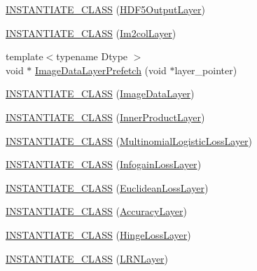 \begin{DoxyCompactItemize}
\item 
\hyperlink{namespacecaffe_a9c470a1804e112ffc6b67533c501a908}{I\+N\+S\+T\+A\+N\+T\+I\+A\+T\+E\+\_\+\+C\+L\+A\+S\+S} (\hyperlink{classcaffe_1_1_h_d_f5_output_layer}{H\+D\+F5\+Output\+Layer})
\item 
\hyperlink{namespacecaffe_a3333b145cd7e8fc3ea5bdc1dfce62ae9}{I\+N\+S\+T\+A\+N\+T\+I\+A\+T\+E\+\_\+\+C\+L\+A\+S\+S} (\hyperlink{classcaffe_1_1_im2col_layer}{Im2col\+Layer})
\item 
{\footnotesize template$<$typename Dtype $>$ }\\void $\ast$ \hyperlink{namespacecaffe_a9a3cc169017ed8893e50354a78b8e079}{Image\+Data\+Layer\+Prefetch} (void $\ast$layer\+\_\+pointer)
\item 
\hyperlink{namespacecaffe_a5d45d14c45e75d872ff0675cd9dbcec1}{I\+N\+S\+T\+A\+N\+T\+I\+A\+T\+E\+\_\+\+C\+L\+A\+S\+S} (\hyperlink{classcaffe_1_1_image_data_layer}{Image\+Data\+Layer})
\item 
\hyperlink{namespacecaffe_aedabc6751279d7a5619ea66e4818bfcb}{I\+N\+S\+T\+A\+N\+T\+I\+A\+T\+E\+\_\+\+C\+L\+A\+S\+S} (\hyperlink{classcaffe_1_1_inner_product_layer}{Inner\+Product\+Layer})
\item 
\hyperlink{namespacecaffe_a2b7ccb24cf58e7aa080107a7adb1635c}{I\+N\+S\+T\+A\+N\+T\+I\+A\+T\+E\+\_\+\+C\+L\+A\+S\+S} (\hyperlink{classcaffe_1_1_multinomial_logistic_loss_layer}{Multinomial\+Logistic\+Loss\+Layer})
\item 
\hyperlink{namespacecaffe_a434258d6113160a68f66d00654ae7a63}{I\+N\+S\+T\+A\+N\+T\+I\+A\+T\+E\+\_\+\+C\+L\+A\+S\+S} (\hyperlink{classcaffe_1_1_infogain_loss_layer}{Infogain\+Loss\+Layer})
\item 
\hyperlink{namespacecaffe_a3486a0b745654ba8a682ff8642fd9b9c}{I\+N\+S\+T\+A\+N\+T\+I\+A\+T\+E\+\_\+\+C\+L\+A\+S\+S} (\hyperlink{classcaffe_1_1_euclidean_loss_layer}{Euclidean\+Loss\+Layer})
\item 
\hyperlink{namespacecaffe_ac8b27282f180a29b393ce42c9bd73998}{I\+N\+S\+T\+A\+N\+T\+I\+A\+T\+E\+\_\+\+C\+L\+A\+S\+S} (\hyperlink{classcaffe_1_1_accuracy_layer}{Accuracy\+Layer})
\item 
\hyperlink{namespacecaffe_a15d7589a16a1216dcf5d2f51759fdf5d}{I\+N\+S\+T\+A\+N\+T\+I\+A\+T\+E\+\_\+\+C\+L\+A\+S\+S} (\hyperlink{classcaffe_1_1_hinge_loss_layer}{Hinge\+Loss\+Layer})
\item 
\hyperlink{namespacecaffe_a818b23abbae9ca690cd0a4bd07a8870e}{I\+N\+S\+T\+A\+N\+T\+I\+A\+T\+E\+\_\+\+C\+L\+A\+S\+S} (\hyperlink{classcaffe_1_1_l_r_n_layer}{L\+R\+N\+Layer})
\item 

\end{DoxyCompactItemize}
